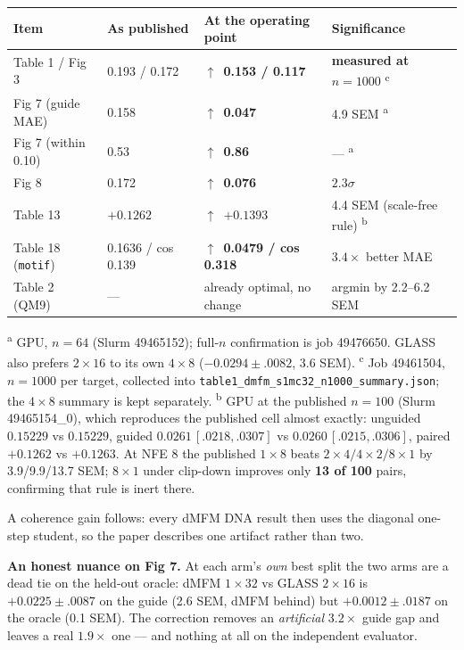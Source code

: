 \documentclass[10pt]{article}
\newcommand{\up}{\textcolor{ok}{$\uparrow$}}
\begin{document}
\begin{center}
\begin{tabular}{@{}llll@{}}
\toprule
\textbf{Item} & \textbf{As published} & \textbf{At the operating point} & \textbf{Significance} \\
\midrule
Table 1 / Fig 3   & 0.193 / 0.172 & \up\ \textbf{0.153 / 0.117} & \textbf{measured at $n{=}1000$} \textsuperscript{c} \\
Fig 7 (guide MAE) & 0.158         & \up\ \textbf{0.047}         & 4.9 SEM \textsuperscript{a} \\
Fig 7 (within 0.10) & 0.53        & \up\ \textbf{0.86}          & --- \textsuperscript{a} \\
Fig 8             & 0.172         & \up\ \textbf{0.076}         & $2.3\sigma$ \\
Table 13          & $+0.1262$     & \up\ \textbf{$+0.1393$}     & 4.4 SEM (scale-free rule) \textsuperscript{b} \\
Table 18 (\texttt{motif}) & 0.1636 / cos 0.139 & \up\ \textbf{0.0479 / cos 0.318} & $3.4\times$ better MAE \\
Table 2 (QM9)     & --- & already optimal, no change & argmin by 2.2--6.2 SEM \\
\bottomrule
\end{tabular}
\end{center}

\noindent\footnotesize\textsuperscript{a} GPU, $n{=}64$ (Slurm 49465152); full-$n$ confirmation is
job 49476650. GLASS also prefers $2{\times}16$ to its own $4{\times}8$ ($-0.0294\pm.0082$, 3.6 SEM).
\textsuperscript{c} Job 49461504, $n{=}1000$ per target, collected into
\texttt{table1\_dmfm\_s1mc32\_n1000\_summary.json}; the $4{\times}8$ summary is kept separately.
\textsuperscript{b} GPU at the published $n{=}100$ (Slurm 49465154\_0), which reproduces the published
cell almost exactly: unguided $0.15229$ vs $0.15229$, guided $0.0261\,[.0218,.0307]$ vs
$0.0260\,[.0215,.0306]$, paired $+0.1262$ vs $+0.1263$. At NFE 8 the published $1{\times}8$ beats
$2{\times}4/4{\times}2/8{\times}1$ by 3.9/9.9/13.7 SEM; $8{\times}1$ under clip-down improves only
\textbf{13 of 100} pairs, confirming that rule is inert there.\normalsize

\noindent A coherence gain follows: every dMFM DNA result then uses the diagonal one-step student,
so the paper describes one artifact rather than two.

\noindent\textbf{An honest nuance on Fig 7.} At each arm's \emph{own} best split the two arms are a
dead tie on the held-out oracle: dMFM $1{\times}32$ vs GLASS $2{\times}16$ is $+0.0225\pm.0087$ on the
guide (2.6 SEM, dMFM behind) but $\mathbf{+0.0012\pm.0187}$ on the oracle (0.1 SEM). The correction
removes an \emph{artificial} $3.2\times$ guide gap and leaves a real $1.9\times$ one --- and nothing at
all on the independent evaluator.
\end{document}

